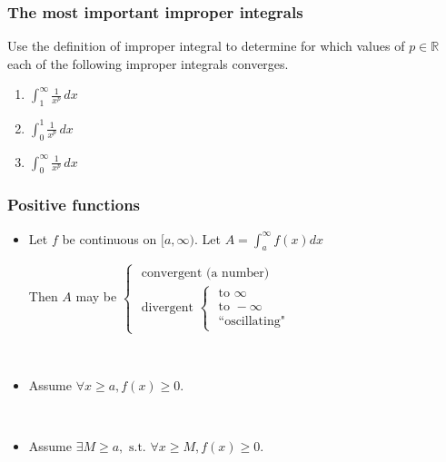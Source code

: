 \documentclass[14pt]{beamer}
\newcommand{\R}{\mathbb{R}}
\newcommand{\p}{\pause}
\newcommand{\setsize}[1]{\fontsize{#1}{#1}\selectfont} %
\newcommand{\smallerfont}{\setsize{13}} %
\begin{document}
	\begin{frame}[t]
		\frametitle{The most important improper integrals}

		Use the definition of improper integral to determine for which values of
		${\displaystyle p \in \R}$ each of the following improper integrals
		converges.

		\begin{enumerate}
			\item ${\displaystyle \int_1^{\infty} \frac{1}{x^{p}} \, dx }$
				\vfill

			\item ${\displaystyle \int_0^1 \frac{1}{x^{p}} \, dx }$
				\vfill

			\item ${\displaystyle \int_0^{\infty} \frac{1}{x^{p}} \, dx }$
				\vfill
		\end{enumerate}
	\end{frame}

	\begin{frame}[t]
		\smallerfont
		\frametitle{Positive functions}

		\begin{itemize}
			\item Let $f$ be continuous on $[a, \infty)$. Let
				${\displaystyle  A = \int_a^{\infty} f(x) dx }$

				Then $A$ may be ${\displaystyle  \begin{cases}\mbox{ convergent (a number) } \\ \mbox{ divergent } \begin{cases}\mbox{ to } \infty \\ \mbox{ to } - \infty \\ \mbox{ ``oscillating"}\end{cases}\end{cases} }$

				\ \p

			\item Assume ${\displaystyle \forall x \geq a, f(x) \geq 0}$.
				\vspace{.2cm}


				\ \p

			\item Assume ${\displaystyle \exists M \geq a, \mbox{ s.t. } \forall x \geq M, f(x) \geq 0}$.
				\vspace{.2cm}

		\end{itemize}
	\end{frame}
\end{document}
